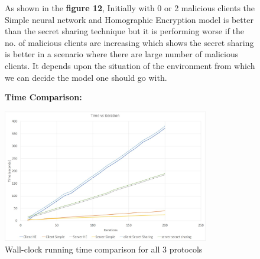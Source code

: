 \documentclass[conference]{IEEEtran}
\begin{document}
\begin{figure}

As shown in the \textbf{figure 12}, Initially with 0 or 2 malicious clients the Simple neural network and Homographic Encryption model is better than the secret sharing technique but it is performing worse if the no. of malicious clients are increasing which shows the secret sharing is better in a scenario where there are large number of malicious clients. It depends upon the situation of the environment from which we can decide the model one should go with.

\vspace{\baselineskip}

\textbf{Time Comparison:}

\vspace{\baselineskip}

\includegraphics[width=90mm,scale=0.7]{all_time_comparison.jpeg}

\caption{ Wall-clock running time comparison for all 3 protocols}
\end{figure}
\end{document}
